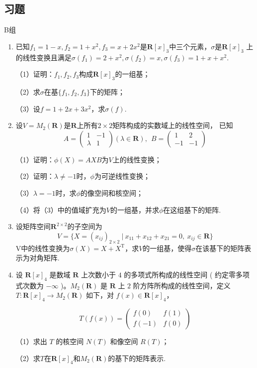 \subsection{习题}
\centerline{\heiti B组}
\begin{enumerate}
	\item 已知$f_1=1-x,f_2=1+x^2,f_3=x+2x^2$是$\mathbf{R}[x]_3$中三个元素，$\sigma$是$\mathbf{R}[x]_3$
	上的线性变换且满足$\sigma(f_1)=2+x^2,\sigma(f_2)=x,\sigma(f_3)=1+x+x^2$.

	（1）证明：$f_1,f_2,f_3$构成$\mathbf{R}[x]_3$的一组基；

	（2）求$\sigma$在基$\{f_1,f_2,f_3\}$下的矩阵；

	（3）设$f=1+2x+3x^2$，求$\sigma(f)$.
	\item 设$V=M_2(\mathbf{R})$是$\mathbf{R}$上所有$2 \times 2$矩阵构成的实数域上的线性空间，
	已知
	$$A=\begin{pmatrix}1 & -1 \\ \lambda & 1 \end{pmatrix}(\lambda \in \mathbf{R}),\ \ B=\begin{pmatrix}1 & 2 \\ -1 & -1 \end{pmatrix}$$

	\textup{（1）}证明：$\phi(X)=AXB$为$V$上的线性变换；

	\textup{（2）}证明：$\lambda\neq-1$时，$\phi$为可逆线性变换；

	\textup{（3）}$\lambda=-1$时，求$\phi$的像空间和核空间；

	\textup{（4）}将\textup{（3）}中的值域扩充为$V$的一组基，并求$\phi$在这组基下的矩阵.
	\item 设矩阵空间$\mathbf{R}^{2\times 2}$的子空间为
	$$V=\{X=(x_{ij})_{2\times 2}\ |\ x_{11}+x_{12}+x_{21}=0,\ x_{ij}\in \mathbf{R}\}$$
	V中的线性变换为$\sigma(X)=X+X^\mathrm{T}$，求$V$的一组基，使得$\sigma$在该基下的矩阵表示为对角矩阵.
	\item 设 $\mathbf{R}[x]_4$ 是数域 $\mathbf{R}$ 上次数小于 $4$ 的多项式所构成的线性空间 ( 约定零多项式次数为 $-\infty$ )。$M_2(\mathbf{R})$ 是 $\mathbf{R}$ 上 $2$ 阶方阵所构成的线性空间，定义 $T : \mathbf{R}[x]_4 \to M_2(\mathbf{R})$ 如下，对 $f(x) \in \mathbf{R}[x]_4$，

	$$
	T(f(x))=\begin{pmatrix}f(0) & f(1) \\ f(-1) & f(0)\end{pmatrix}
	$$
	
	\textup{（1）}求出 $T$ 的核空间 $N(T)$ 和像空间 $R(T)$；
	
	\textup{（2）}求$T$在$\mathbf{R}[x]_4$和$M_2(\mathbf{R})$的基下的矩阵表示.
\end{enumerate}
